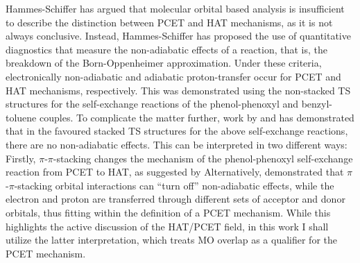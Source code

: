 \begin{doublespace}
Hammes-Schiffer has argued that molecular orbital based analysis is insufficient
to describe the distinction between PCET and HAT mechanisms, as it is not always
conclusive.\cite{Skone2006, HammesSchiffer2015} Instead, Hammes-Schiffer has
proposed the use of quantitative diagnostics that measure the non-adiabatic
effects of a reaction, that is, the breakdown of the Born-Oppenheimer
approximation.\cite{Sirjoosingh2011, HammesSchiffer2015} Under these criteria,
electronically non-adiabatic and adiabatic proton-transfer occur for PCET and
HAT mechanisms, respectively. This was demonstrated using the non-stacked TS
structures for the self-exchange reactions of the phenol-phenoxyl and
benzyl-toluene couples. To complicate the matter further, work by
\citet{Inagaki2011} and \citet{MunozRugeles2017} has demonstrated that in the
favoured stacked TS structures for the above self-exchange reactions, there are
no non-adiabatic effects. This can be interpreted in two different ways:
Firstly, $\pi$-$\pi$-stacking changes the mechanism of the phenol-phenoxyl
self-exchange reaction from PCET to HAT, as suggested by \citet{Inagaki2011}
Alternatively, \citet{MunozRugeles2017} demonstrated that $\pi$-$\pi$-stacking
orbital interactions can ``turn off'' non-adiabatic effects, while the electron
and proton are transferred through different sets of acceptor and donor
orbitals, thus fitting within the definition of a PCET mechanism. While this
highlights the active discussion of the HAT/PCET field, in this work I shall
utilize the latter interpretation, which treats MO overlap as a qualifier for
the PCET mechanism.


\end{doublespace}
